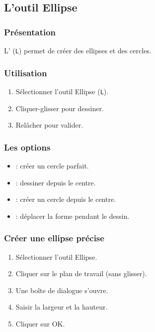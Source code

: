 \subsection{L'outil Ellipse}

\subsubsection{Présentation}

L' (\texttt{L}) permet de créer des ellipses et des cercles.

\subsubsection{Utilisation}

\begin{enumerate}
    \item Sélectionner l'outil Ellipse (\texttt{L}).
    \item Cliquer-glisser pour dessiner.
    \item Relâcher pour valider.
\end{enumerate}

\subsubsection{Les options}

\begin{itemize}
    \item {} : créer un cercle parfait.
    \item {} : dessiner depuis le centre.
    \item {} : créer un cercle depuis le centre.
    \item {} : déplacer la forme pendant le dessin.
\end{itemize}

\subsubsection{Créer une ellipse précise}

\begin{enumerate}
    \item Sélectionner l'outil Ellipse.
    \item Cliquer sur le plan de travail (sans glisser).
    \item Une boîte de dialogue s'ouvre.
    \item Saisir la largeur et la hauteur.
    \item Cliquer sur OK.
\end{enumerate}

